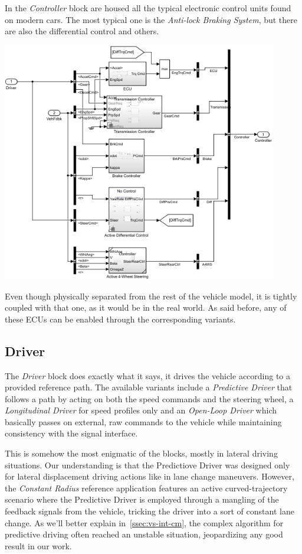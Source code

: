 		In the \emph{Controller} block are housed all the typical electronic control units found on modern cars. The most typical one is the \emph{Anti-lock Braking System},
		but there are also the differential control and others. 
		\begin{center}
			\includegraphics[width=0.9\textwidth]{Images/Simulator/ctrl-full}
		\end{center}

		Even though physically separated from the rest of the vehicle model, it is tightly coupled with that one, as it would be in the real world. As said before, any of these ECUs
		can be enabled through the corresponding variants.

		\subsection{Driver}
		\label{ssec:vs-env-drv}

		The \emph{Driver} block does exactly what it says, it drives the vehicle according to a provided reference path.
		The available variants include a \emph{Predictive Driver} that follows a path by acting on both the speed commands and the steering wheel,
		a \emph{Longitudinal Driver} for speed profiles only and an \emph{Open-Loop Driver} which basically passes on external, raw commands to the vehicle
		while maintaining consistency with the signal interface.
		
		This is somehow the most enigmatic of the blocks, mostly in lateral driving situations. Our understanding is that the Predictiove Driver was designed only for
		lateral displacement driving actions like in lane change maneuvers. However, the \emph{Constant Radius} reference application features an active curved-trajectory
		scenario where the Predictive Driver is employed through a mangling of the feedback signals from the vehicle, tricking the driver into a sort of constant lane change. As
		we'll better explain in~\vref{ssec:vs-int-cm}, the complex algorithm for predictive driving often reached an unstable situation, jeopardizing any good result in our work.


